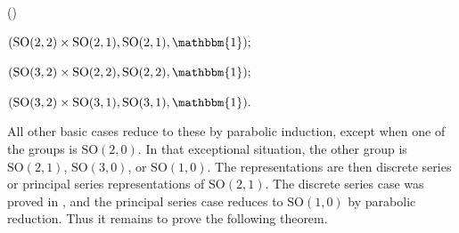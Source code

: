 \documentclass[12pt]{amsart}
\numberwithin{equation}{subsection}
\newcounter{keepeqno}
\newenvironment{num}
 {\setcounter{keepeqno}{\value{equation}}%
  \begin{list}{(\theequation)}{\usecounter{equation}}%
  \setcounter{equation}{\value{keepeqno}}}
 {\end{list}}
\newcommand{\SO}{{\mathrm{SO}}}
\def\SO{\mathrm{SO}}
\begin{document}
\begin{num}
\item\label{case:1}
$
(\SO(2,2)\times \SO(2,1),\SO(2,1),\mathbbm{1});
$

\item\label{case:2}
$
(\SO(3,2)\times \SO(2,2),\SO(2,2),\mathbbm{1});
$

\item\label{case:3}
$
(\SO(3,2)\times \SO(3,1),\SO(3,1),\mathbbm{1}).
$
\end{num}
All other basic cases reduce to these by parabolic induction, except when one of the groups is $\SO(2,0)$. In that exceptional situation, the other group is $\SO(2,1)$, $\SO(3,0)$, or $\SO(1,0)$. The representations are then discrete series or principal series representations of $\SO(2,1)$. The discrete series case was proved in \cite{MR1295124}, and the principal series case reduces to $\SO(1,0)$ by parabolic reduction. Thus it remains to prove the following theorem.
\end{document}
